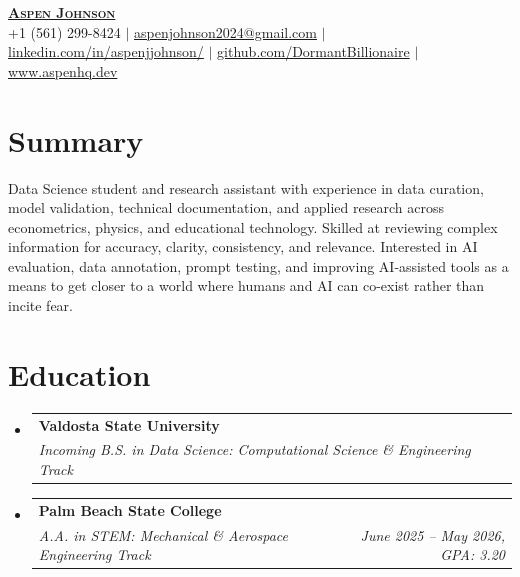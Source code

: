 \documentclass[letterpaper,11pt]{article}
\makeatletter
\newcommand{\resumeEducationEntry}[3]{
  \vspace{-2pt}\item
    \begin{tabular*}{0.97\textwidth}[t]{l@{\extracolsep{\fill}}r}
      \textbf{#1} & \\
      \textit{\small#2} & \textit{\small #3} \hfill
    \end{tabular*}\vspace{-4pt}
}
\newcommand{\resumeSubHeadingListStart}{\begin{itemize}[leftmargin=0.15in, label={}]}
\newcommand{\resumeSubHeadingListEnd}{\end{itemize}}
\makeatother
\begin{document}

\begin{center}
    \textbf{\Huge \scshape \underline{Aspen Johnson}} \\ \vspace{5pt}
    \small +1 (561) 299-8424 $|$ \href{mailto:aspenjohnson2024@gmail.com}{aspenjohnson2024@gmail.com} $|$
    \href{https://www.linkedin.com/in/aspenjjohnson/}{linkedin.com/in/aspenjjohnson/} $|$
    \href{https://github.com/DormantBillionaire}{github.com/DormantBillionaire} $|$
    \href{https://www.aspenhq.dev/}{www.aspenhq.dev}
\end{center}

\section{Summary}
  Data Science student and research assistant with experience in data curation, model validation, technical documentation, and applied research across econometrics, 
  physics, and educational technology. Skilled at reviewing complex information for accuracy, clarity, consistency, and relevance. Interested in AI evaluation, 
  data annotation, prompt testing, and improving AI-assisted tools as a means to get closer to a world where humans and AI can co-exist rather than incite fear.

\section{Education}
  \resumeSubHeadingListStart
    \resumeEducationEntry
      {Valdosta State University}
      {Incoming B.S. in Data Science: Computational Science \& Engineering Track}
      {}

    \resumeEducationEntry
      {Palm Beach State College}
      {A.A. in STEM: Mechanical \& Aerospace Engineering Track}
      {June 2025 -- May 2026, GPA: 3.20}
  \resumeSubHeadingListEnd
  
\end{document}
